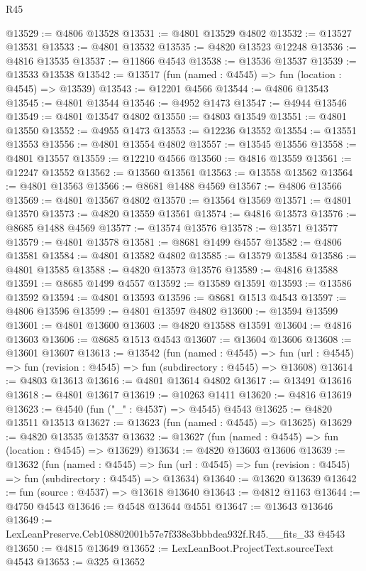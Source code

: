 \begin{lexlean}{R45}
\begin{coremodule}
@13529 := @4806 @13528
@13531 := @4801 @13529 @4802
@13532 := @13527 @13531
@13533 := @4801 @13532
@13535 := @4820 @13523 @12248
@13536 := @4816 @13535
@13537 := @11866 @4543
@13538 := @13536 @13537
@13539 := @13533 @13538
@13542 := @13517 (fun (named : @4545) => fun (location : @4545) => @13539)
@13543 := @12201 @4566
@13544 := @4806 @13543
@13545 := @4801 @13544
@13546 := @4952 @1473
@13547 := @4944 @13546
@13549 := @4801 @13547 @4802
@13550 := @4803 @13549
@13551 := @4801 @13550
@13552 := @4955 @1473
@13553 := @12236 @13552
@13554 := @13551 @13553
@13556 := @4801 @13554 @4802
@13557 := @13545 @13556
@13558 := @4801 @13557
@13559 := @12210 @4566
@13560 := @4816 @13559
@13561 := @12247 @13552
@13562 := @13560 @13561
@13563 := @13558 @13562
@13564 := @4801 @13563
@13566 := @8681 @1488 @4569
@13567 := @4806 @13566
@13569 := @4801 @13567 @4802
@13570 := @13564 @13569
@13571 := @4801 @13570
@13573 := @4820 @13559 @13561
@13574 := @4816 @13573
@13576 := @8685 @1488 @4569
@13577 := @13574 @13576
@13578 := @13571 @13577
@13579 := @4801 @13578
@13581 := @8681 @1499 @4557
@13582 := @4806 @13581
@13584 := @4801 @13582 @4802
@13585 := @13579 @13584
@13586 := @4801 @13585
@13588 := @4820 @13573 @13576
@13589 := @4816 @13588
@13591 := @8685 @1499 @4557
@13592 := @13589 @13591
@13593 := @13586 @13592
@13594 := @4801 @13593
@13596 := @8681 @1513 @4543
@13597 := @4806 @13596
@13599 := @4801 @13597 @4802
@13600 := @13594 @13599
@13601 := @4801 @13600
@13603 := @4820 @13588 @13591
@13604 := @4816 @13603
@13606 := @8685 @1513 @4543
@13607 := @13604 @13606
@13608 := @13601 @13607
@13613 := @13542
    (fun (named : @4545) =>
    fun (url : @4545) => fun (revision : @4545) => fun (subdirectory : @4545) => @13608)
@13614 := @4803 @13613
@13616 := @4801 @13614 @4802
@13617 := @13491 @13616
@13618 := @4801 @13617
@13619 := @10263 @1411
@13620 := @4816 @13619
@13623 := @4540 (fun ("_" : @4537) => @4545) @4543
@13625 := @4820 @13511 @13513
@13627 := @13623 (fun (named : @4545) => @13625)
@13629 := @4820 @13535 @13537
@13632 := @13627 (fun (named : @4545) => fun (location : @4545) => @13629)
@13634 := @4820 @13603 @13606
@13639 := @13632
    (fun (named : @4545) =>
    fun (url : @4545) => fun (revision : @4545) => fun (subdirectory : @4545) => @13634)
@13640 := @13620 @13639
@13642 := fun (source : @4537) => @13618 @13640
@13643 := @4812 @1163
@13644 := @4750 @4543
@13646 := @4548 @13644 @4551
@13647 := @13643 @13646
@13649 := LexLeanPreserve.Ceb108802001b57e7f338e3bbbdea932f.R45.__fits_33 @4543
@13650 := @4815 @13649
@13652 := LexLeanBoot.ProjectText.sourceText @4543
@13653 := @325 @13652

\end{coremodule}
\end{lexlean}
